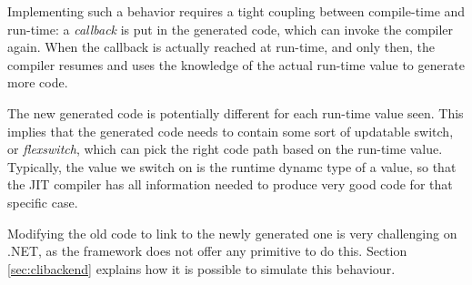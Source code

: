 Implementing such a behavior requires a tight coupling between compile-time
and run-time: a \emph{callback} is put in the generated code, which can invoke
the compiler again.  When the callback is actually reached at run-time, and
only then, the compiler resumes and uses the knowledge of the actual run-time
value to generate more code.

The new generated code is potentially different for each run-time value seen.
This implies that the generated code needs to contain some sort of updatable
switch, or \emph{flexswitch}, which can pick the right code path based on the
run-time value.  Typically, the value we switch on is the runtime dynamc type
of a value, so that the JIT compiler has all information needed to produce
very good code for that specific case.


Modifying the old code to link to the newly generated one is very challenging on
.NET, as the framework does not offer any primitive to do this.  Section
\ref{sec:clibackend} explains how it is possible to simulate this behaviour.

